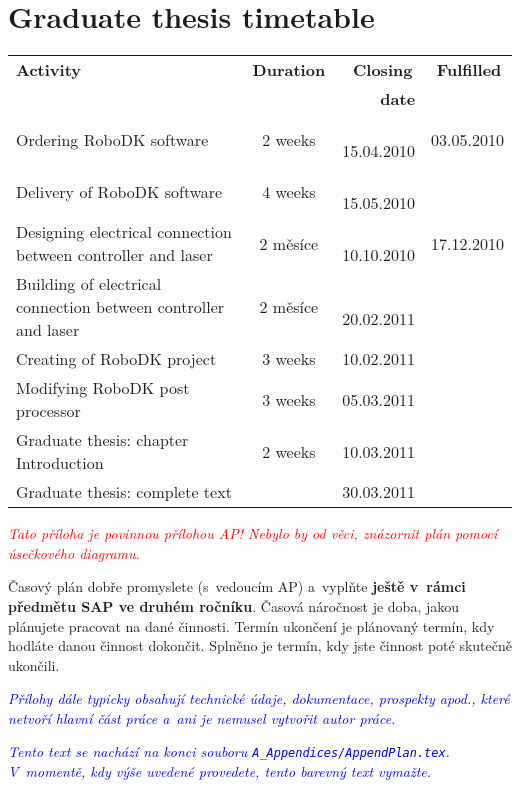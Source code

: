 ﻿\chapter{Graduate thesis timetable \label{ch:ApendPLAN}}


\begin{center}
\begin{tabular}{|p{8cm}|c|r|r|}
  \hline
  \textbf{\hspace{3.3cm} Activity} & \textbf{Duration} & \textbf{Closing\,} & \textbf{Fulfilled\,} \\
  {} & \textbf{} & \textbf{date} & {} \\
  \hline

  {Ordering RoboDK software}
                & {2 weeks} & \,{15.04.2010} & {03.05.2010} \\\hline
  {Delivery of RoboDK software}
                & {4 weeks} & \,{15.05.2010} & {} \\\hline
  {Designing electrical connection between controller and laser}
                & {2 měsíce} & \,{10.10.2010} & {17.12.2010} \\\hline
  {Building of electrical connection between controller and laser}
                & {2 měsíce} & \,{20.02.2011} & {} \\\hline
  {Creating of RoboDK project}
                & {3 weeks} & {10.02.2011} & {} \\\hline
  {Modifying RoboDK post processor}
                & {3 weeks} & {05.03.2011} & {} \\\hline
  {Graduate thesis: chapter Introduction}
                & {2 weeks} & {10.03.2011} & {} \\\hline
  {Graduate thesis: complete text}
                & {} & {30.03.2011} & {} \\\hline
\end{tabular}
\end{center}





\textcolor{red}{\em Tato příloha je povinnou přílohou AP! Nebylo by od věci, znázornit plán pomocí úsečkového diagramu.\/}

Časový plán dobře promyslete (s~vedoucím AP) a~vyplňte \textbf{ještě v~rámci předmětu SAP ve druhém ročníku}. Časová náročnost je doba, jakou plánujete pracovat na dané činnosti. Termín ukončení je plánovaný termín, kdy hodláte danou činnost dokončit. Splněno je termín, kdy jste činnost poté skutečně ukončili.

\textcolor{blue}{\em Přílohy dále typicky obsahují technické údaje, dokumentace, prospekty apod., kte\-ré netvoří hlavní část práce a~ani je nemusel vytvořit autor práce.\/}

\textcolor{blue}{\em Tento text se nachází na konci souboru \texttt{A\_Appendices/AppendPlan.tex}. V~momentě, kdy výše uvedené provedete, tento barevný text vymažte.\/} 
